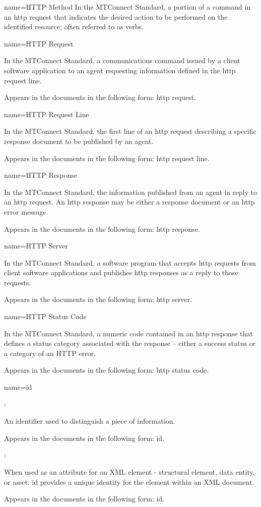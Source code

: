 {
  name={HTTP Method}
}
{
	In the MTConnect Standard, a portion of a command in an \gls{http request} that indicates the desired action to be performed on the identified resource; often referred to as verbs.
}


{
  name={HTTP Request}
}
{
	In the MTConnect Standard, a communications command issued by a client software application to an \gls{agent} requesting information defined in the \gls{http request line}.

	Appears in the documents in the following form: \gls{http request}.
}


{
  name={HTTP Request Line}
}
{
	In the MTConnect Standard, the first line of an \gls{http request} describing a specific \gls{response document} to be published by an \gls{agent}.

	Appears in the documents in the following form: \gls{http request line}.
}


{
  name={HTTP Response}
}
{
	In the MTConnect Standard, the information published from an \gls{agent} in reply to an \gls{http request}.  An \gls{http response} may be either a \gls{response document} or an \gls{http error message}.

	Appears in the documents in the following form: \gls{http response}.
}


{
  name={HTTP Server}
}
{
	In the MTConnect Standard, a software program that accepts \glspl{http request} from client software applications and publishes \glspl{http response} as a reply to those \glspl{request}.

	Appears in the documents in the following form: \gls{http server}.
}


{
  name={HTTP Status Code}
}
{
	In the MTConnect Standard, a numeric code contained in an \gls{http response} that defines a status category associated with the \gls{response} – either a success status or a category of an HTTP error.  

	Appears in the documents in the following form: \gls{http status code}.
}


{
  name={id}
}
{
	:

	An identifier used to distinguish a piece of information.

	Appears in the documents in the following form: id.

	:

	When used as an attribute for an XML element - \gls{structural element}, \gls{data entity}, or \gls{asset}.  \gls{id} provides a unique identity for the element within an XML document.

	Appears in the documents in the following form: \gls{id}.
}


